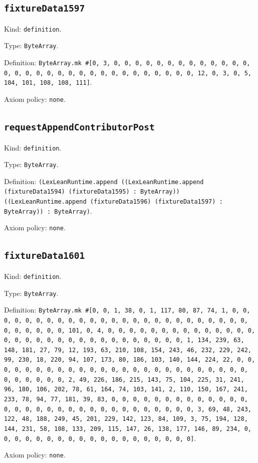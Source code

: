 \documentclass[11pt]{article}
\begin{document}
\subsection*{\texttt{fixtureData1597}}
\noindent Kind: \texttt{definition}.\par
\noindent Type: \texttt{ByteArray}.\par
\noindent Definition: \texttt{ByteArray.mk \#[0, 3, 0, 0, 0, 0, 0, 0, 0, 0, 0, 0, 0, 0, 0, 0, 0, 0, 0, 0, 0, 0, 0, 0, 0, 0, 0, 0, 0, 0, 0, 0, 0, 12, 0, 3, 0, 5, 104, 101, 108, 108, 111]}.\par
\noindent Axiom policy: \texttt{none}.\par
\subsection*{\texttt{requestAppendContributorPost}}
\noindent Kind: \texttt{definition}.\par
\noindent Type: \texttt{ByteArray}.\par
\noindent Definition: \texttt{(LexLeanRuntime.append ((LexLeanRuntime.append (fixtureData1594) (fixtureData1595) : ByteArray)) ((LexLeanRuntime.append (fixtureData1596) (fixtureData1597) : ByteArray)) : ByteArray)}.\par
\noindent Axiom policy: \texttt{none}.\par
\subsection*{\texttt{fixtureData1601}}
\noindent Kind: \texttt{definition}.\par
\noindent Type: \texttt{ByteArray}.\par
\noindent Definition: \texttt{ByteArray.mk \#[0, 0, 1, 38, 0, 1, 117, 80, 87, 74, 1, 0, 0, 0, 0, 0, 0, 0, 0, 0, 0, 0, 0, 0, 0, 0, 0, 0, 0, 0, 0, 0, 0, 0, 0, 0, 0, 0, 0, 0, 0, 0, 101, 0, 4, 0, 0, 0, 0, 0, 0, 0, 0, 0, 0, 0, 0, 0, 0, 0, 0, 0, 0, 0, 0, 0, 0, 0, 0, 0, 0, 0, 0, 0, 0, 0, 1, 134, 239, 63, 148, 181, 27, 79, 12, 193, 63, 210, 108, 154, 243, 46, 232, 229, 242, 99, 230, 18, 220, 94, 107, 173, 80, 186, 103, 140, 144, 224, 22, 0, 0, 0, 0, 0, 0, 0, 0, 0, 0, 0, 0, 0, 0, 0, 0, 0, 0, 0, 0, 0, 0, 0, 0, 0, 0, 0, 0, 0, 0, 0, 2, 49, 226, 186, 215, 143, 75, 104, 225, 31, 241, 96, 180, 106, 202, 78, 61, 164, 74, 103, 141, 2, 110, 150, 167, 241, 233, 78, 94, 77, 181, 39, 83, 0, 0, 0, 0, 0, 0, 0, 0, 0, 0, 0, 0, 0, 0, 0, 0, 0, 0, 0, 0, 0, 0, 0, 0, 0, 0, 0, 0, 0, 0, 0, 3, 69, 48, 243, 122, 48, 188, 249, 45, 201, 229, 142, 123, 84, 109, 3, 75, 194, 128, 144, 231, 58, 108, 133, 209, 115, 147, 26, 138, 177, 146, 89, 234, 0, 0, 0, 0, 0, 0, 0, 0, 0, 0, 0, 0, 0, 0, 0, 0, 0, 0, 0]}.\par
\noindent Axiom policy: \texttt{none}.\par
\end{document}
